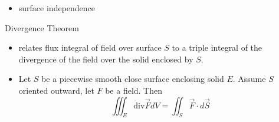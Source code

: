 \documentclass[11pt]{article}
\theoremstyle{definition}
\begin{document}
\begin{multicols}{2}
{\begin{itemize}
      \[ \oint_C \vec{F}\cdot d\vec{r} = \iint_S \text{curl}\vec{F}\cdot d\vec{S} \]
      \item surface independence
    \end{itemize}
    Divergence Theorem
    \begin{itemize}
      \item relates flux integral of field over surface $S$ to a triple integral of the divergence of the field over the solid enclosed by $S$.
      \item Let $S$ be a piecewise smooth close surface enclosing solid $E$. Assume $S$ oriented outward, let $F$ be a field. Then
      \[ \iiint_E \text{div}\vec{F}dV = \iint_S \vec{F}\cdot d\vec{S} \]
    \end{itemize}
  }
\end{multicols}
\end{document}

